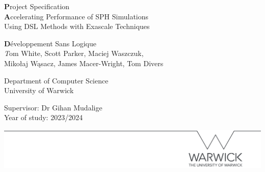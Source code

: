 \newcommand\ProjectTitle{Accelerating Performance of SPH Simulations\\ Using DSL Methods with Exascale Techniques}
\newcommand\Title{Project Specification}
\newcommand\Author{D\'eveloppement Sans Logique}
\newcommand\Department{Department of Computer Science}
\newcommand\Institution{University of Warwick}
\newcommand\YearOfStudy{Year of study: 2023/2024}
\newcommand\Supervisor{Supervisor: Dr Gihan Mudalige} %
\newcommand\Team{Tom White, Scott Parker, Maciej Waszczuk,\\ Miko\l{}aj W\k{a}sacz, James Macer-Wright, Tom Divers}

\begin{titlepage}
    \begin{center}
        \vspace*{1cm}

        \huge\textbf\Title \\
        \vspace{1cm}
        \Large\textbf\ProjectTitle

        \vspace{1cm}

        \large\textbf\Author \\
        \textit\Team \\

        \vspace{1cm}
        
        \Department \\
        \Institution

        \vfill

        \Supervisor \\
        \YearOfStudy

        \vspace*{3cm}
        
        \begin{adjustwidth}{-1in}{-1in}
            \includegraphics[width=\paperwidth]{thesis/graphics/line.png}
        \end{adjustwidth}
    
        \vspace*{-1.0cm}
        
    \end{center}
\end{titlepage}
